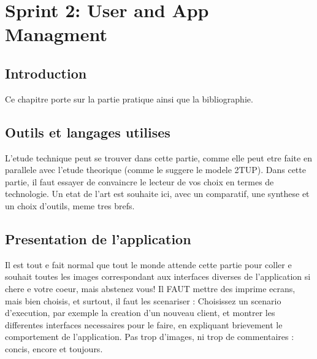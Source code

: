 
\setcounter{chapter}{3}
\chapter{Sprint 2: User and App Managment}
\minitoc %
\graphicspath{{Chapter4/figures/}}

\pagestyle{fancy}
\fancyhf{}
\fancyhead[R]{\bfseries\rightmark}
\fancyfoot[R]{\thepage}
\renewcommand{\headrulewidth}{0.5pt}
\renewcommand{\footrulewidth}{0pt}
\renewcommand{\chaptermark}[1]{\markboth{\MakeUppercase{\chaptername~\thechapter. #1 }}{}}
\renewcommand{\sectionmark}[1]{\markright{\thechapter.\thesection~ #1}}

\begin{spacing}{1.2}

\section*{Introduction}
Ce chapitre porte sur la partie pratique ainsi que la bibliographie.

\section{Outils et langages utilises}
L'etude technique peut se trouver dans cette partie, comme elle peut etre faite en
parallele avec l'etude theorique (comme le suggere le modele 2TUP).
Dans cette partie, il faut essayer de convaincre le lecteur de vos choix en termes de
technologie. Un etat de l'art est souhaite ici, avec un comparatif, une synthese et un choix 
d'outils, meme tres brefs.
\section{Presentation de l'application}
Il est tout e fait normal que tout le monde attende cette partie pour coller e souhait toutes les images
correspondant aux interfaces diverses de l'application si chere e votre coeur, mais
abstenez vous! Il FAUT mettre des imprime ecrans, mais bien choisis, et surtout, il faut les scenariser : Choisissez un scenario d'execution, par exemple la creation d'un 
nouveau client, et montrer les differentes interfaces necessaires pour le faire, en
expliquant brievement le comportement de l'application. Pas trop d'images, ni trop de
commentaires : concis, encore et toujours.


\end{spacing}
